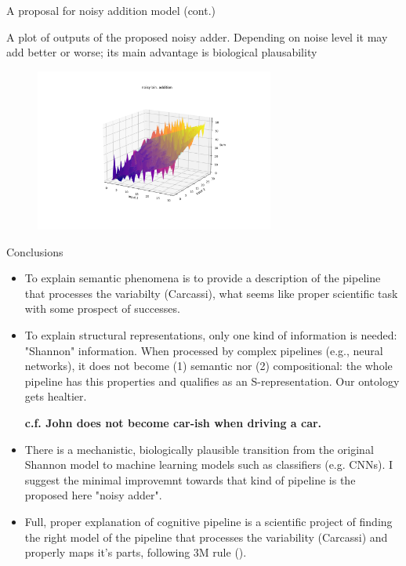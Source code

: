 \documentclass[10pt, aspectratio=169, handout]{beamer}
\begin{document}
    

\begin{frame}{A proposal for noisy addition model (cont.)}
   
    A plot of outputs of the proposed noisy adder. Depending on noise level it may add better or worse; its main advantage is biological plausability
        
        \begin{figure}[h!]
            \centering
            \includegraphics[width=0.7\textwidth]{images/anoisy_adding.png}
            \caption{}
            \label{fig:noisy_adder}
        \end{figure}
    
    
    
    \end{frame}
    


    
    \begin{frame}{Conclusions }
    
        \begin{itemize}
           \item To explain semantic phenomena is to provide a description of the pipeline that processes the variabilty (Carcassi),  what seems like proper scientific task with some prospect of successes.
          
            \item To explain  structural representations, only one kind of information is needed: "Shannon" information. When processed by complex pipelines (e.g., neural networks), it does not become  (1) semantic nor (2) compositional: the whole pipeline has this properties  and qualifies as an S-representation. Our ontology gets healtier. 
            
        \textbf{    c.f. John does not become car-ish when driving a car.}

            \item There is a mechanistic, biologically plausible transition from the original Shannon model to machine learning models such as classifiers (e.g. CNNs). I suggest the minimal improvemnt towards that kind of pipeline is the proposed here "noisy adder".
            
            \item Full, proper explanation of cognitive pipeline is a scientific project of finding the right model of the pipeline that processes the variability (Carcassi) and properly maps it's parts, following 3M rule (\cite{Craver}).
        \end{itemize}
      
    \end{frame}
    
\end{document}
